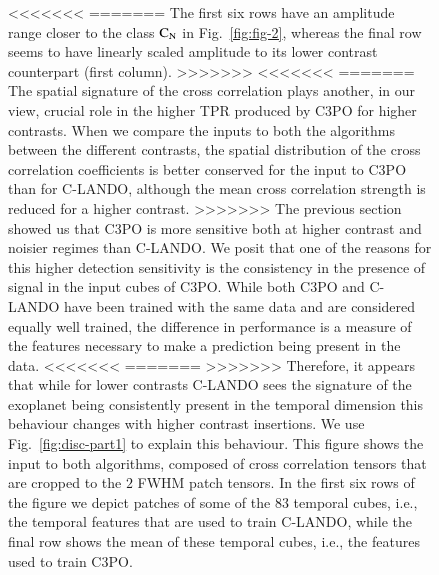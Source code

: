 \documentclass{aa}
\newcommand{\newchange}[1]{\textcolor{darkgreen}{#1}}
\begin{document}
{{{\begin{figure}[t]
{<<<<<<<
=======
The first six rows have an amplitude range closer to the class $\rm{C_N}$ in Fig.~\ref{fig:fig-2}, whereas the final row seems to have linearly scaled amplitude to its lower contrast counterpart (first column).
>>>>>>>
<<<<<<<
=======
The spatial signature of the cross correlation plays another, in our view, crucial role in the higher TPR produced by C3PO for higher contrasts.
When we compare the inputs to both the algorithms between the different contrasts, the spatial distribution of the cross correlation coefficients is better conserved for the input to C3PO than for C-LANDO, although the mean cross correlation strength is reduced for a higher contrast.
>>>>>>>
The previous section showed us that C3PO is more sensitive both at higher contrast and noisier regimes than C-LANDO.
We posit that one of the reasons for this higher detection sensitivity is the consistency in the presence of signal in the input cubes of C3PO.
While both C3PO and C-LANDO have been trained with the same data and are considered equally well trained, the difference in performance is a measure of the features necessary to make a prediction being present in the data.
<<<<<<<
=======
>>>>>>>
Therefore, it appears that while for lower contrasts C-LANDO sees the signature of the exoplanet being consistently present in the temporal dimension this behaviour changes with higher contrast insertions.
We use Fig.~\ref{fig:disc-part1} to explain this behaviour.
This figure shows the input to both algorithms, composed of cross correlation tensors that are cropped to the $2$ FWHM patch tensors.
In the first six rows of the figure we depict patches of some of the $83$ temporal cubes, i.e., the temporal features that are used to train C-LANDO, while the final row shows the mean of these temporal cubes, i.e., the features used to train C3PO.
}
\end{figure}}}}
\end{document}
